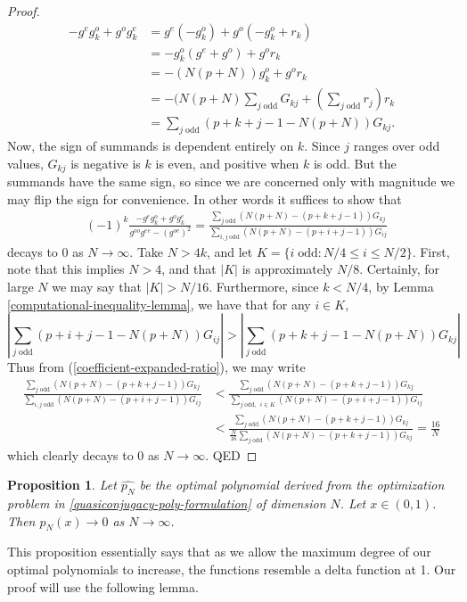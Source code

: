 \documentclass{article}
\newtheorem{prop}[thm]{Proposition}
\theoremstyle{definition}
\theoremstyle{remark}
\numberwithin{equation}{section}
\begin{document}
\begin{proof}
\begin{align*}
-g^eg_k^o + g^og_k^e &= g^e(-g^o_k) + g^o(-g^o_k + r_k)\\
&= -g^o_k(g^e+g^o) + g^o r_k\\
&= -(N(p+N))g_k^o + g^or_k\\
&= -(N(p+N)\sum_{j \; \text{odd}} G_{kj} + \left(\sum_{j \; \text{odd}}r_j \right)r_k \\
&= \sum_{j\; \text{odd}} (p+k+j-1 - N(p+N))G_{kj}.
\end{align*}
Now, the sign of summands is dependent entirely on $k$. Since $j$ ranges over odd values, $G_{kj}$ is negative is $k$ is even, and positive when $k$ is odd. But the summands have the same sign, so since we are concerned only with magnitude we may flip the sign for convenience. In other words it suffices to show that
\begin{align}\label{coefficient-expanded-ratio}
&(-1)^k\frac{-g^eg_k^o + g^og_k^e}{g^{oo} g^{ee}-(g^{oe})^2} = \frac{ \sum_{j\; \text{odd}} (N(p+N) -(p+k+j-1))G_{kj}}{ \sum_{i,j \; \text{odd}}  (N(p+N) -(p+i+j-1))G_{ij}}
\end{align}
decays to 0 as $N\to \infty$. Take $N>4k$, and let $K = \{i \; \text{odd}: N/4  \le i \le N/2\}$. First, note that this implies $N>4$, and that $|K|$ is approximately $N/8$. Certainly, for large $N$ we may say that $|K|>N/16$. Furthermore, since $k<N/4$, by Lemma \ref{computational-inequality-lemma}, we have that for any $i\in K$, 
\begin{equation}\label{inequality-sum-of-products} \left|\sum_{j\; \text{odd}} (p+i+j-1 - N(p+N))G_{ij} \right| > \left| \sum_{j\; \text{odd}} (p+k+j-1 - N(p+N))G_{kj} \right|\end{equation}
Thus from (\ref{coefficient-expanded-ratio}), we may write
\begin{align*}
\frac{ \sum_{j\; \text{odd}} (N(p+N) -(p+k+j-1))G_{kj}}{ \sum_{i,j \; \text{odd}}  (N(p+N) -(p+i+j-1))G_{ij}} &< \frac{ \sum_{j\; \text{odd}} (N(p+N) -(p+k+j-1))G_{kj}}{ \sum_{j\; \text{odd, }\; i\in K}  (N(p+N) -(p+i+j-1))G_{ij}}\\
& < \frac{ \sum_{j\; \text{odd}} (N(p+N) -(p+k+j-1))G_{kj}}{\frac{N}{16} \sum_{j \; \text{odd}}  (N(p+N) -(p+k+j-1))G_{kj}} = \frac{16}{N}
\end{align*} which clearly decays to 0 as $N\to \infty$. QED
\end{proof}

\begin{prop}\label{pointwise-convergence-zero-one-function}
Let $\hat{p_N}$ be the optimal polynomial derived from the optimization problem in \ref{quasiconjugacy-poly-formulation} of dimension $N$. Let $x\in (0,1)$. Then $p_N(x) \to 0$ as $N\to \infty$. 
\end{prop}
This proposition essentially says that as we allow the maximum degree of our optimal polynomials to increase, the functions resemble a delta function at 1. Our proof will use the following lemma.
\end{document}
